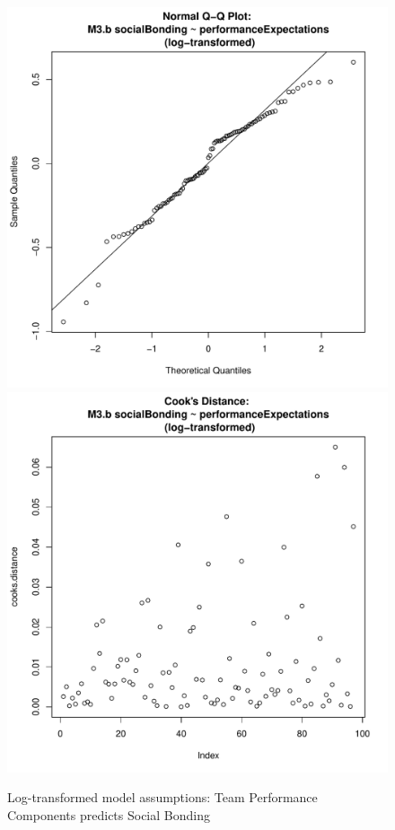 \begin{CJK}{UTF8}{gbsn}
\begin{figure}[htbp]
        \includegraphics[scale =.4]{images/MLM3bLogQQNorm.pdf}
        \includegraphics[scale =.4]{images/MLM3bLogCooksD.pdf}
        \caption{Log-transformed model assumptions: Team Performance Components predicts Social Bonding}
        \label{fig:MLM3bLogAssumptions}
      \end{figure}





\end{CJK}
